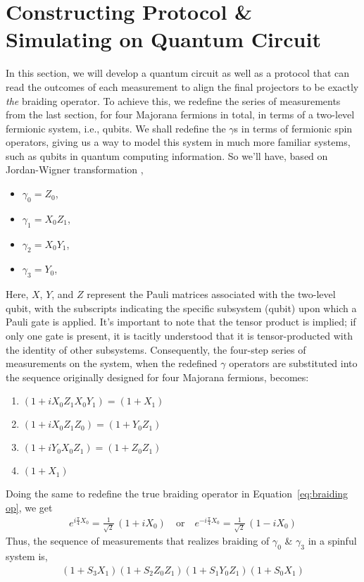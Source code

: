 \documentclass{article}
\begin{document}
\section{Constructing Protocol \& Simulating on Quantum Circuit} %
\label{sec:Constructing Protocol}
In this section, we will develop a quantum circuit as well as a protocol that can read the outcomes of each measurement to align the final projectors to be exactly \textit{the} braiding operator. To achieve this, we redefine the series of measurements from the last section, for four Majorana fermions in total, in terms of a two-level fermionic system, i.e., qubits. We shall redefine the $ \gamma $s in terms of fermionic spin operators, giving us a way to model this system in much more familiar systems, such as qubits in quantum computing information. So we'll have, based on Jordan-Wigner transformation \cite{Backens_2017},
\begin{itemize}
	\item $ \gamma_0 = Z_0 $,
	\item $ \gamma_1 = X_0 Z_1 $,
	\item $ \gamma_2 = X_0 Y_1 $,
	\item $ \gamma_3 = Y_0 $,
\end{itemize}
Here, \(X\), \(Y\), and \(Z\) represent the Pauli matrices associated with the two-level qubit, with the subscripts indicating the specific subsystem (qubit) upon which a Pauli gate is applied. It's important to note that the tensor product is implied; if only one gate is present, it is tacitly understood that it is tensor-producted with the identity of other subsystems. Consequently, the four-step series of measurements on the system, when the redefined \( \gamma \) operators are substituted into the sequence originally designed for four Majorana fermions, becomes:
\begin{enumerate}
	\item $ (1 + i X_0 Z_1 X_0 Y_1) = (1 + X_1) $
	\item $ (1 + i X_0 Z_1 Z_0) = (1 + Y_0 Z_1) $
	\item $ (1 + i Y_0 X_0 Z_1) = (1 + Z_0 Z_1) $
	\item $ (1 + X_1) $
\end{enumerate}
Doing the same to redefine the true braiding operator in Equation~\ref{eq:braiding op}, we get
$$
	\begin{aligned}
		e^{i \frac{\pi}{4} X_0} = \frac{1}{\sqrt{2}}\, (1 + i X_0 ) \quad \text{or} \quad
		e^{-i \frac{\pi}{4} X_0} = \frac{1}{\sqrt{2}}\, (1 - i X_0 )
		\label{eq:br Jordan-Wigner}
	\end{aligned}
$$
Thus, the sequence of measurements that realizes braiding of $ \gamma_0 $ \& $ \gamma_3 $ in a spinful system is,
\begin{equation}
	\begin{aligned}
		(1 +S_3 X_1) (1 +S_2 Z_0 Z_1) (1 +S_1 Y_0 Z_1) (1 +S_0 X_1)
		\label{eq:fermionic meas seq}
	\end{aligned}
\end{equation}
\end{document}
